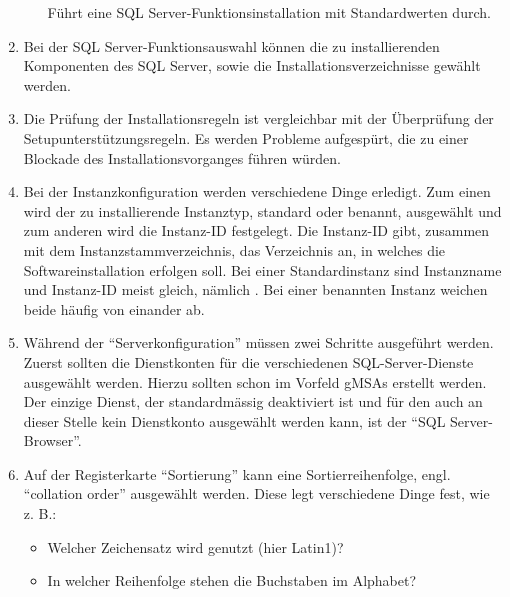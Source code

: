 \begin{enumerate}
\begin{itemize}
              Führt eine SQL Server-Funktionsinstallation mit Standardwerten
              durch.
          \end{itemize}
          \item Bei der SQL Server-Funktionsauswahl können die zu installierenden
          Komponenten des SQL Server, sowie die Installationsverzeichnisse
          gewählt werden.
          \item Die Prüfung der Installationsregeln ist vergleichbar mit der
          Überprüfung der Setupunterstützungsregeln. Es werden Probleme
          aufgespürt, die zu einer Blockade des Installationsvorganges führen
          würden.
          \item Bei der Instanzkonfiguration werden verschiedene Dinge erledigt.
          Zum einen wird der zu installierende Instanztyp, standard oder benannt,
          ausgewählt und zum anderen wird die Instanz-ID festgelegt. Die
          Instanz-ID gibt, zusammen mit dem Instanzstammverzeichnis, das
          Verzeichnis an, in welches die Softwareinstallation erfolgen soll. Bei
          einer Standardinstanz sind Instanzname und Instanz-ID meist gleich,
          nämlich . Bei einer benannten Instanz weichen beide
          häufig von einander ab.
\clearpage
          \item Während der \enquote{Serverkonfiguration} müssen zwei Schritte
          ausgeführt werden. Zuerst sollten die Dienstkonten für die verschiedenen
          SQL-Server-Dienste ausgewählt werden. Hierzu sollten schon im Vorfeld
          gMSAs erstellt werden. Der einzige Dienst, der standardmässig
          deaktiviert ist und für den auch an dieser Stelle kein Dienstkonto
          ausgewählt werden kann, ist der \enquote{SQL Server-Browser}.
          \item Auf der Registerkarte \enquote{Sortierung} kann eine
          Sortierreihenfolge, engl. \enquote{collation order} ausgewählt werden.
          Diese legt verschiedene Dinge fest, wie z. B.:
          \begin{itemize}
              \item Welcher Zeichensatz wird genutzt (hier Latin1)?
              \item In welcher Reihenfolge stehen die Buchstaben im Alphabet?

\end{itemize}
\end{enumerate}
